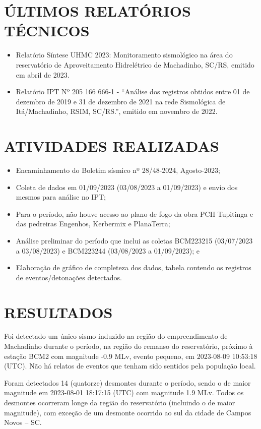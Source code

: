 \section{ÚLTIMOS RELATÓRIOS TÉCNICOS}
\label{sec:ultimos_relatorios}
\begin{itemize}
    \item Relatório Síntese UHMC 2023: Monitoramento sismológico na área do reservatório de Aproveitamento Hidrelétrico de Machadinho, SC/RS, emitido em abril de 2023.
    \item Relatório IPT Nº 205 166 666-1 - “Análise dos registros obtidos entre 01 de dezembro de 2019 e 31 de dezembro de 2021 na rede Sismológica de Itá/Machadinho, RSIM, SC/RS.”, emitido em novembro de 2022.
\end{itemize}

\section{ATIVIDADES REALIZADAS}
\label{sec:atividade}
\begin{itemize}
    \item Encaminhamento do Boletim sísmico nº 28/48-2024, Agosto-2023;
    \item Coleta de dados em 01/09/2023 (03/08/2023 a 01/09/2023) e envio dos mesmos para análise no IPT;
    \item Para o período, não houve acesso ao plano de fogo da obra PCH Tupitinga e das pedreiras Engenhos, Kerbermix e PlanaTerra;
    \item Análise preliminar do período que inclui as coletas BCM223215 (03/07/2023 a 03/08/2023) e BCM223244 (03/08/2023 a 01/09/2023); e
    \item Elaboração de gráfico de completeza dos dados, tabela contendo os registros de eventos/detonações detectados.
\end{itemize}

\section{RESULTADOS}
\label{sec:resultados}
Foi detectado um único sismo induzido na região do empreendimento de Machadinho durante o período, na região do remanso do reservatório, próximo à estação BCM2 com magnitude -0.9 MLv, evento pequeno, em 2023-08-09 10:53:18 (UTC). Não há relatos de eventos que tenham sido sentidos pela população local.

Foram detectados 14 (quatorze) desmontes durante o período, sendo o de maior magnitude em 2023-08-01 18:17:15 (UTC) com magnitude 1.9 MLv. Todos os desmontes ocorreram longe da região do reservatório (incluindo o de maior magnitude), com exceção de um desmonte ocorrido ao sul da cidade de Campos Novos – SC.

